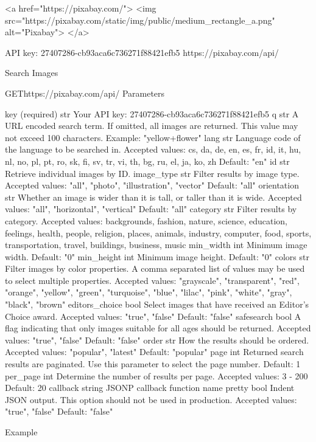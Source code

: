<a href="https://pixabay.com/">
    <img src="https://pixabay.com/static/img/public/medium_rectangle_a.png" alt="Pixabay">
</a>


API key: 27407286-cb93aca6c736271f88421efb5
https://pixabay.com/api/


Search Images

GEThttps://pixabay.com/api/
Parameters

key (required)	str	Your API key: 27407286-cb93aca6c736271f88421efb5
q	str	A URL encoded search term. If omitted, all images are returned. This value may not exceed 100 characters. 
Example: "yellow+flower"
lang	str	Language code of the language to be searched in. 
Accepted values: cs, da, de, en, es, fr, id, it, hu, nl, no, pl, pt, ro, sk, fi, sv, tr, vi, th, bg, ru, el, ja, ko, zh 
Default: "en"
id	str	Retrieve individual images by ID.
image_type	str	Filter results by image type. 
Accepted values: "all", "photo", "illustration", "vector" 
Default: "all"
orientation	str	Whether an image is wider than it is tall, or taller than it is wide. 
Accepted values: "all", "horizontal", "vertical" 
Default: "all"
category	str	Filter results by category. 
Accepted values: backgrounds, fashion, nature, science, education, feelings, health, people, religion, places, animals, industry, computer, food, sports, transportation, travel, buildings, business, music
min_width	int	Minimum image width. 
Default: "0"
min_height	int	Minimum image height. 
Default: "0"
colors	str	Filter images by color properties. A comma separated list of values may be used to select multiple properties. 
Accepted values: "grayscale", "transparent", "red", "orange", "yellow", "green", "turquoise", "blue", "lilac", "pink", "white", "gray", "black", "brown"
editors_choice	bool	Select images that have received an Editor's Choice award. 
Accepted values: "true", "false" 
Default: "false"
safesearch	bool	A flag indicating that only images suitable for all ages should be returned. 
Accepted values: "true", "false" 
Default: "false"
order	str	How the results should be ordered. 
Accepted values: "popular", "latest" 
Default: "popular"
page	int	Returned search results are paginated. Use this parameter to select the page number. 
Default: 1
per_page	int	Determine the number of results per page. 
Accepted values: 3 - 200 
Default: 20
callback	string	JSONP callback function name
pretty	bool	Indent JSON output. This option should not be used in production. 
Accepted values: "true", "false" 
Default: "false"



Example

